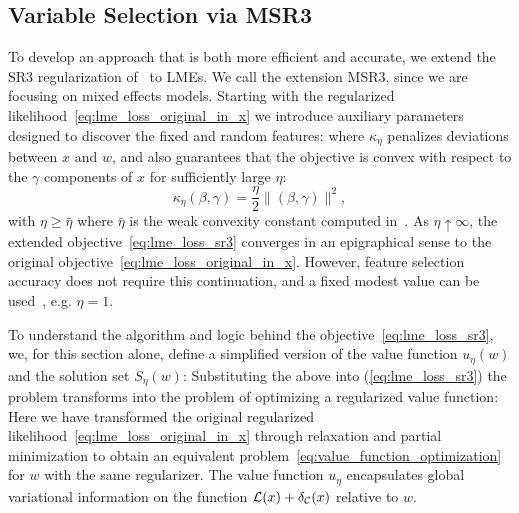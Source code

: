 \subsection{Variable Selection via MSR3}

To develop an approach that is both more efficient and accurate, we extend the SR3 regularization of~\cite{Zheng2019SR3} to LMEs. 
We call the extension MSR3, since we are focusing on mixed effects models. 
Starting with the regularized likelihood~\eqref{eq:lme_loss_original_in_x} we introduce auxiliary parameters designed to discover the 
fixed and random features: 
where $\kappa_\eta$ penalizes deviations between $x$ and $w$, and also guarantees that the objective is convex with respect to the $\gamma$
components of $x$ for sufficiently large $\eta$:
\begin{equation}
\label{eq:kappa}
\kappa_{\eta} (\beta, \gamma) = \frac{\eta}{2}\|(\beta,\gamma)\|^2 ,
\end{equation}
with $\eta\ge\bar\eta$ where $\bar \eta$ is the weak convexity constant
computed in~\cite[Section 5.1]{Theory1}.
As $\eta \uparrow \infty$, the extended objective~\eqref{eq:lme_loss_sr3} converges in an epigraphical sense to the original objective~\eqref{eq:lme_loss_original_in_x}. 
However, feature selection accuracy does not require this continuation, and a fixed 
modest value can be used~\citep{Zheng2019SR3}, e.g. $\eta=1$.

To understand the algorithm and logic behind the objective~\eqref{eq:lme_loss_sr3}, we, for this section alone, define a simplified version of the value function $u_\eta(w)$ and the solution set $S_\eta(w)$:
Substituting the above into (\ref{eq:lme_loss_sr3}) the problem transforms into the problem of optimizing a regularized value function:
Here we have transformed the original regularized likelihood~\eqref{eq:lme_loss_original_in_x}  %
through relaxation and partial 
minimization to obtain an equivalent problem~\eqref{eq:value_function_optimization} 
for $w$ with the same regularizer. The value function $u_\eta$ encapsulates 
global variational information on the function $\operatorname{\mathcal{L}}(x) + \delta_{\mathcal{C}}(x)$
relative to $w$.

